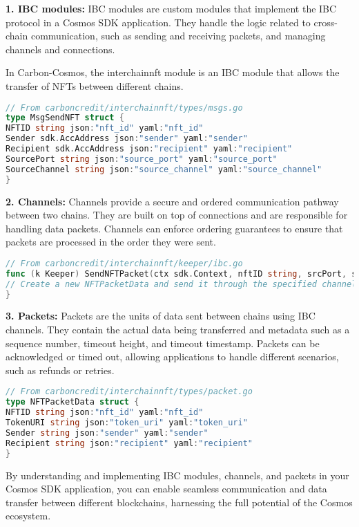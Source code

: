 \documentclass{article}
\begin{document}
\textbf{1. IBC modules:} IBC modules are custom modules that implement the IBC protocol in a Cosmos SDK application. They handle the logic related to cross-chain communication, such as sending and receiving packets, and managing channels and connections.

In Carbon-Cosmos, the interchainnft module is an IBC module that allows the transfer of NFTs between different chains.

\begin{lstlisting}[language=Go]
// From carboncredit/interchainnft/types/msgs.go
type MsgSendNFT struct {
NFTID string json:"nft_id" yaml:"nft_id"
Sender sdk.AccAddress json:"sender" yaml:"sender"
Recipient sdk.AccAddress json:"recipient" yaml:"recipient"
SourcePort string json:"source_port" yaml:"source_port"
SourceChannel string json:"source_channel" yaml:"source_channel"
}
\end{lstlisting}

\textbf{2. Channels:} Channels provide a secure and ordered communication pathway between two chains. They are built on top of connections and are responsible for handling data packets. Channels can enforce ordering guarantees to ensure that packets are processed in the order they were sent.

\begin{lstlisting}[language=Go]
// From carboncredit/interchainnft/keeper/ibc.go
func (k Keeper) SendNFTPacket(ctx sdk.Context, nftID string, srcPort, srcChannel string, timeoutHeight clienttypes.Height, timeoutTimestamp uint64, nft types.BaseNFT) error {
// Create a new NFTPacketData and send it through the specified channel
}
\end{lstlisting}

\textbf{3. Packets:} Packets are the units of data sent between chains using IBC channels. They contain the actual data being transferred and metadata such as a sequence number, timeout height, and timeout timestamp. Packets can be acknowledged or timed out, allowing applications to handle different scenarios, such as refunds or retries.

\begin{lstlisting}[language=Go]
// From carboncredit/interchainnft/types/packet.go
type NFTPacketData struct {
NFTID string json:"nft_id" yaml:"nft_id"
TokenURI string json:"token_uri" yaml:"token_uri"
Sender string json:"sender" yaml:"sender"
Recipient string json:"recipient" yaml:"recipient"
}
\end{lstlisting}

By understanding and implementing IBC modules, channels, and packets in your Cosmos SDK application, you can enable seamless communication and data transfer between different blockchains, harnessing the full potential of the Cosmos ecosystem.
\end{document}
